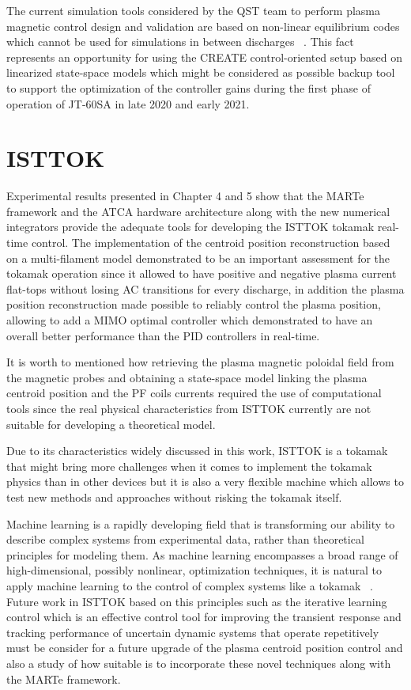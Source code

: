  The current simulation tools  considered by the QST team  to perform plasma magnetic control design and validation are based on  non-linear equilibrium codes which cannot be used for  simulations in between discharges ~\cite{MECS}. This fact represents an opportunity for using the CREATE  control-oriented setup based on  linearized state-space models which might  be considered as possible backup tool to support the optimization of the controller gains during the first phase of operation of JT-60SA in late 2020 and early 2021.


\section{ISTTOK}

Experimental results presented in Chapter 4 and 5 show that the MARTe framework and the ATCA hardware architecture along with the new numerical integrators provide the adequate tools for developing the ISTTOK tokamak real-time control. The implementation of the centroid position reconstruction based on a multi-filament model demonstrated to be an important assessment for the tokamak operation since  it allowed to have  positive and negative plasma current flat-tops without losing AC transitions for every discharge, in addition the plasma position reconstruction made  possible to reliably control the plasma position, allowing to add a MIMO optimal controller which demonstrated to have an overall better performance than the PID controllers in real-time. \smallskip


It is worth to mentioned how retrieving the plasma magnetic poloidal field from the magnetic probes and obtaining a state-space model linking the plasma centroid position and the PF coils currents required the use of computational tools since the real physical characteristics from ISTTOK currently are not suitable for developing a theoretical model.\smallskip

Due to its characteristics widely discussed in this work, ISTTOK is a tokamak that might bring  more challenges when it comes to implement the tokamak physics than in other devices but it is also a very flexible machine which allows to test new methods and approaches without risking the tokamak itself.\smallskip

Machine learning is a rapidly developing field that is transforming our ability to describe complex systems from experimental data, rather than theoretical principles for modeling them. As machine learning encompasses a broad range of high-dimensional, possibly nonlinear, optimization techniques, it is natural to apply machine learning to the control of complex systems like a tokamak ~\cite[Chapter~10]{DataDriven2019}. Future work in ISTTOK based on this principles such as the iterative learning control which is an effective control tool for improving the transient response and tracking performance of uncertain dynamic systems that operate repetitively~\cite{Ahn2007}  must be consider for a future upgrade of the plasma centroid position control and also a study of how suitable is to incorporate these novel techniques along with the MARTe framework.
